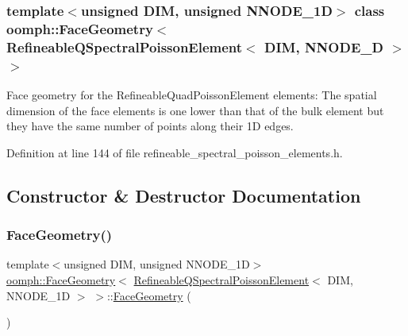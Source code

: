 \subsubsection*{template$<$unsigned D\+IM, unsigned N\+N\+O\+D\+E\+\_\+1D$>$\newline
class oomph\+::\+Face\+Geometry$<$ Refineable\+Q\+Spectral\+Poisson\+Element$<$ D\+I\+M, N\+N\+O\+D\+E\+\_\+D $>$ $>$}

Face geometry for the Refineable\+Quad\+Poisson\+Element elements\+: The spatial dimension of the face elements is one lower than that of the bulk element but they have the same number of points along their 1D edges. 

Definition at line 144 of file refineable\+\_\+spectral\+\_\+poisson\+\_\+elements.\+h.



\subsection{Constructor \& Destructor Documentation}
\mbox{\label{classoomph_1_1FaceGeometry_3_01RefineableQSpectralPoissonElement_3_01DIM_00_01NNODE__1D_01_4_01_4_acdf070b85d2bc39509209149ccbf7abc}} 
\subsubsection{\texorpdfstring{Face\+Geometry()}{FaceGeometry()}}
{\footnotesize\ttfamily template$<$unsigned D\+IM, unsigned N\+N\+O\+D\+E\+\_\+1D$>$ \\
\hyperlink{classoomph_1_1FaceGeometry}{oomph\+::\+Face\+Geometry}$<$ \hyperlink{classoomph_1_1RefineableQSpectralPoissonElement}{Refineable\+Q\+Spectral\+Poisson\+Element}$<$ D\+IM, N\+N\+O\+D\+E\+\_\+1D $>$ $>$\+::\hyperlink{classoomph_1_1FaceGeometry}{Face\+Geometry} (\begin{DoxyParamCaption}{ }\end{DoxyParamCaption})\hspace{0.3cm}{\ttfamily [inline]}}



